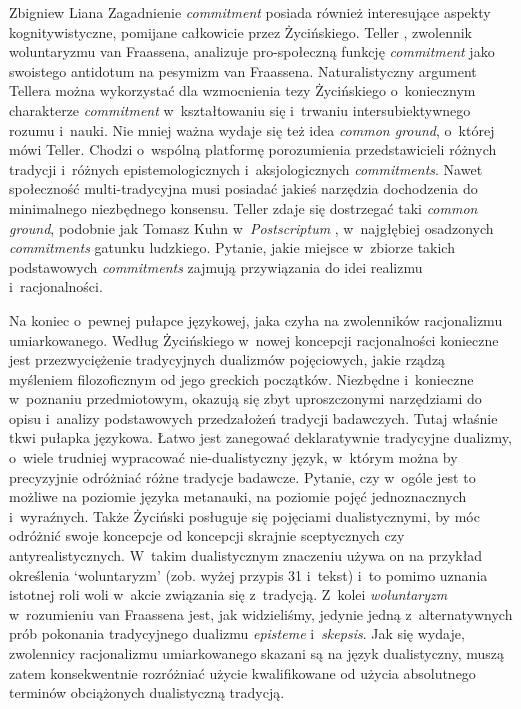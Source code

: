 \begin{artplenv}{Zbigniew Liana}
Zagadnienie \textit{commitment} posiada również interesujące aspekty kognitywistyczne, pomijane całkowicie przez Życińskiego. Teller
\parencite*[][s.~65n]{teller_learning_2011}, %
 zwolennik woluntaryzmu van Fraassena, analizuje pro-społeczną funkcję \textit{commitment} jako swoistego antidotum na pesymizm van Fraassena. Naturalistyczny argument Tellera można wykorzystać dla wzmocnienia tezy Życińskiego o~koniecznym charakterze \textit{commitment} w~kształtowaniu się i~trwaniu intersubiektywnego rozumu i~nauki. Nie mniej ważna wydaje się też idea \textit{common ground}, o~której mówi Teller. Chodzi o~wspólną platformę porozumienia przedstawicieli różnych tradycji i~różnych epistemologicznych i~aksjologicznych \textit{commitments}. Nawet społeczność multi-tradycyjna musi posiadać jakieś narzędzia dochodzenia do minimalnego niezbędnego konsensu. Teller zdaje się dostrzegać taki \textit{common ground}, podobnie jak Tomasz Kuhn w~\textit{Postscriptum} 
\parencite*[][s.~346n]{kuhn_struktura_2001}, %
 w~najgłębiej osadzonych \textit{commitments} gatunku ludzkiego. Pytanie, jakie miejsce w~zbiorze takich podstawowych \textit{commitments} zajmują przywiązania do idei realizmu i~racjonalności.

Na koniec o~pewnej pułapce językowej, jaka czyha na zwolenników racjonalizmu umiarkowanego. Według Życińskiego w~nowej koncepcji racjonalności konieczne jest przezwyciężenie tradycyjnych dualizmów pojęciowych, jakie rządzą myśleniem filozoficznym od jego greckich początków. Niezbędne i~konieczne w~poznaniu przedmiotowym, okazują się zbyt uproszczonymi narzędziami do opisu i~analizy podstawowych przedzałożeń tradycji badawczych. Tutaj właśnie tkwi pułapka językowa. Łatwo jest zanegować deklaratywnie tradycyjne dualizmy, o~wiele trudniej wypracować nie-dualistyczny język, w~którym można by precyzyjnie odróżniać różne tradycje badawcze. Pytanie, czy w~ogóle jest to możliwe na poziomie języka metanauki, na poziomie pojęć jednoznacznych i~wyraźnych. Także Życiński posługuje się pojęciami dualistycznymi, by móc odróżnić swoje koncepcje od koncepcji skrajnie sceptycznych czy antyrealistycznych. W~takim dualistycznym znaczeniu używa on na przykład określenia ‘woluntaryzm' (zob. wyżej przypis 31 i~tekst) i~to pomimo uznania istotnej roli woli w~akcie związania się z~tradycją. Z~kolei \textit{woluntaryzm} w~rozumieniu van Fraassena jest, jak widzieliśmy, jedynie jedną z~alternatywnych prób pokonania tradycyjnego dualizmu \textit{episteme} i~\textit{skepsis}. Jak się wydaje, zwolennicy racjonalizmu umiarkowanego skazani są na język dualistyczny, muszą zatem konsekwentnie rozróżniać użycie kwalifikowane od użycia absolutnego terminów obciążonych dualistyczną tradycją.

\end{artplenv}\label{liana-ende}